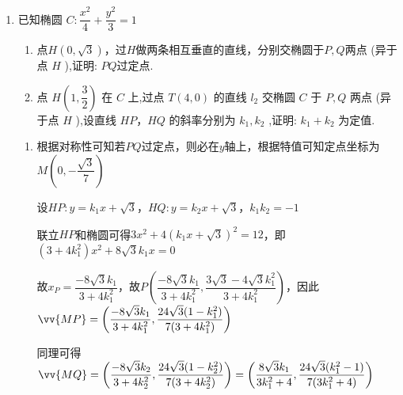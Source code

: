 \begin{enumerate}
    \item 已知椭圆 $C : \dfrac{{x}^{2}}{4} + \dfrac{{y}^{2}}{3} = 1$
    \begin{enumerate}
        \item 点$H(0, \sqrt{3})$，过$H$做两条相互垂直的直线，分别交椭圆于$P,Q$两点 (异于点 $H$ ),证明: $PQ$过定点.
        \item 点 $H\left( {1,\dfrac{3}{2}}\right)$ 在 $C$ 上,过点 $T\left( {4,0}\right)$ 的直线 ${l}_{2}$ 交椭圆 $C$ 于 $P,Q$ 两点 (异于点 $H$ ),设直线 ${HP}$，${HQ}$ 的斜率分别为 ${k}_{1},{k}_{2}$ ,证明: ${k}_{1} + {k}_{2}$ 为定值.
    \end{enumerate}
    \begin{jieda}
        \begin{enumerate}
            \item 根据对称性可知若$PQ$过定点，则必在$y$轴上，根据特值可知定点坐标为$M\left(0, -\dfrac{\sqrt{3}}{7}\right)$

            设$HP: y = k_1x+\sqrt{3}$，$HQ: y = k_2x+\sqrt{3}$，$k_1k_2 = -1$

            联立$HP$和椭圆可得$3x^2+4(k_1x+\sqrt{3})^2 = 12$，即$(3+4k_1^2)x^2+8\sqrt{3}k_1x = 0$

            故$x_P = \dfrac{-8\sqrt{3}k_1}{3+4k_1^2}$，故$P\left(\dfrac{-8\sqrt{3}k_1}{3+4k_1^2}, \dfrac{3\sqrt{3}-4\sqrt{3}k_1^2}{3+4k_1^2}\right)$，因此$\vv{MP} = \left(\dfrac{-8\sqrt{3}k_1}{3+4k_1^2}, \dfrac{24\sqrt{3}(1-k_1^2)}{7(3+4k_1^2)}\right)$

            同理可得$\vv{MQ} = \left(\dfrac{-8\sqrt{3}k_2}{3+4k_2^2}, \dfrac{24\sqrt{3}(1-k_2^2)}{7(3+4k_2^2)}\right) = \left(\dfrac{8\sqrt{3}k_1}{3k_1^2+4}, \dfrac{24\sqrt{3}(k_1^2-1)}{7(3k_1^2+4)}\right)$


\end{enumerate}
\end{jieda}
\end{enumerate}
